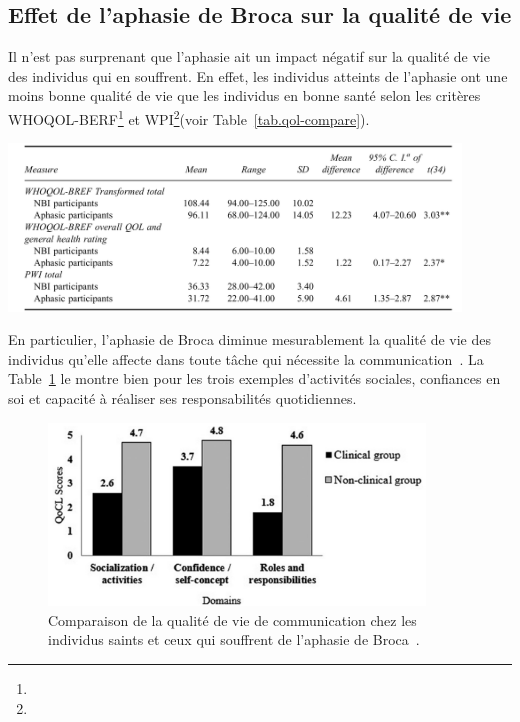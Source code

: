 \subsection{Effet de l'aphasie de Broca sur la qualité de vie}

Il n'est pas surprenant que l'aphasie ait un impact négatif sur la qualité de vie des individus qui en souffrent.
En effet, les individus atteints de l'aphasie ont une moins bonne qualité de vie que les individus en bonne santé
selon les critères WHOQOL-BERF\footnote{} 
et WPI\footnote{}(voir Table~\ref{tab.qol-compare}).

\begin{table}[hbt]
    \centering
    \includegraphics[width=12cm]{assets/images/qol.png}
    \caption[Comparaison de la qualité de vie chez les individus saints et ceux qui souffrent d'une aphasie.]%
    {Comparaison de la qualité de vie chez les individus saints et ceux qui souffrent d'une aphasie~\cite{Ross_Wertz_2010}.}
    \label{tab.qol-compare}
\end{table}

En particulier, l'aphasie de Broca diminue mesurablement la qualité de vie des individus qu'elle affecte
dans toute tâche qui nécessite la communication~\cite{Pallavi_Perumal_Krupa_2018}. 
La Table~\ref{fig.qocl-compare} le montre bien pour les trois exemples d'activités sociales, confiances en soi
et capacité à réaliser ses responsabilités quotidiennes.

\begin{figure}[hbt]
    \centering
    \includegraphics[width=10cm]{assets/images/qocl.png}
    \caption[Comparaison de la qualité de vie de communication chez les individus saints et ceux qui souffrent de l'aphasie de Broca.]%
    {Comparaison de la qualité de vie de communication chez les individus saints et ceux qui souffrent de l'aphasie de Broca~\cite{Pallavi_Perumal_Krupa_2018}.}
    \label{fig.qocl-compare}
\end{figure}

